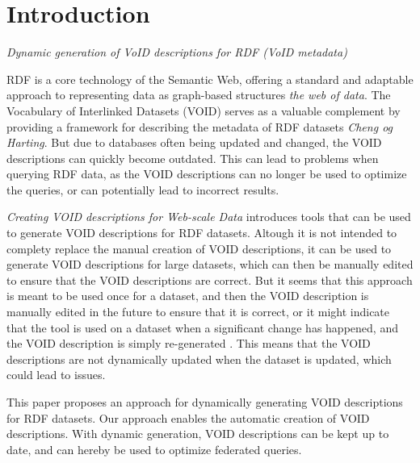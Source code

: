 \section{Introduction}\label{sec:introduction2}
\emph{Dynamic generation of VoID descriptions for RDF (VoID metadata)}

RDF is a core technology of the Semantic Web, offering a standard and adaptable approach to representing data as graph-based structures \emph{the web of data}. The Vocabulary of Interlinked Datasets (VOID) serves as a valuable complement by providing a framework for describing the metadata of RDF datasets \emph{Cheng og Harting}. But due to databases often being updated and changed, the VOID descriptions can quickly become outdated. This can lead to problems when querying RDF data, as the VOID descriptions can no longer be used to optimize the queries, or can potentially lead to incorrect results.

\emph{Creating VOID descriptions for Web-scale Data} introduces tools that can be used to generate VOID descriptions for RDF datasets. Altough it is not intended to complety replace the manual creation of VOID descriptions, it can be used to generate VOID descriptions for large datasets, which can then be manually edited to ensure that the VOID descriptions are correct. But it seems that this approach is meant to be used once for a dataset, and then the VOID description is manually edited in the future to ensure that it is correct, or it might indicate that the tool is used on a dataset when a significant change has happened, and the VOID description is simply re-generated . This means that the VOID descriptions are not dynamically updated when the dataset is updated, which could lead to issues.

This paper proposes an approach for dynamically generating VOID descriptions for RDF datasets. Our approach enables the automatic creation of VOID descriptions. With dynamic generation, VOID descriptions can be kept up to date, and can hereby be used to optimize federated queries. 




